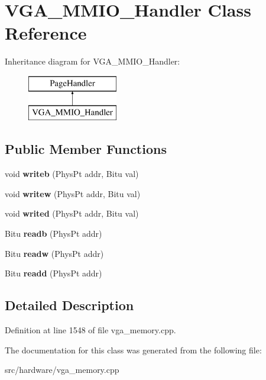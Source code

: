 \hypertarget{classVGA__MMIO__Handler}{\section{V\-G\-A\-\_\-\-M\-M\-I\-O\-\_\-\-Handler Class Reference}
\label{classVGA__MMIO__Handler}
}
Inheritance diagram for V\-G\-A\-\_\-\-M\-M\-I\-O\-\_\-\-Handler\-:\begin{figure}[H]
\begin{center}
\leavevmode
\includegraphics[height=2.000000cm]{classVGA__MMIO__Handler}
\end{center}
\end{figure}
\subsection*{Public Member Functions}
\begin{DoxyCompactItemize}
\item 
\hypertarget{classVGA__MMIO__Handler_a779662658a576ce1bd9aa3179e424495}{void {\bfseries writeb} (Phys\-Pt addr, Bitu val)}\label{classVGA__MMIO__Handler_a779662658a576ce1bd9aa3179e424495}

\item 
\hypertarget{classVGA__MMIO__Handler_a25ce81cdbb53959e45187ab1ac650cb2}{void {\bfseries writew} (Phys\-Pt addr, Bitu val)}\label{classVGA__MMIO__Handler_a25ce81cdbb53959e45187ab1ac650cb2}

\item 
\hypertarget{classVGA__MMIO__Handler_a60397669cf87d269153e5d1554cc16c4}{void {\bfseries writed} (Phys\-Pt addr, Bitu val)}\label{classVGA__MMIO__Handler_a60397669cf87d269153e5d1554cc16c4}

\item 
\hypertarget{classVGA__MMIO__Handler_aefab83f4a14d5626418aa371839e426f}{Bitu {\bfseries readb} (Phys\-Pt addr)}\label{classVGA__MMIO__Handler_aefab83f4a14d5626418aa371839e426f}

\item 
\hypertarget{classVGA__MMIO__Handler_a96360a3e09a8373dcb7a01266b3aa82e}{Bitu {\bfseries readw} (Phys\-Pt addr)}\label{classVGA__MMIO__Handler_a96360a3e09a8373dcb7a01266b3aa82e}

\item 
\hypertarget{classVGA__MMIO__Handler_a4fed3f110d17dda1ffb040a0e979f5cc}{Bitu {\bfseries readd} (Phys\-Pt addr)}\label{classVGA__MMIO__Handler_a4fed3f110d17dda1ffb040a0e979f5cc}

\end{DoxyCompactItemize}


\subsection{Detailed Description}


Definition at line 1548 of file vga\-\_\-memory.\-cpp.



The documentation for this class was generated from the following file\-:\begin{DoxyCompactItemize}
\item 
src/hardware/vga\-\_\-memory.\-cpp\end{DoxyCompactItemize}
